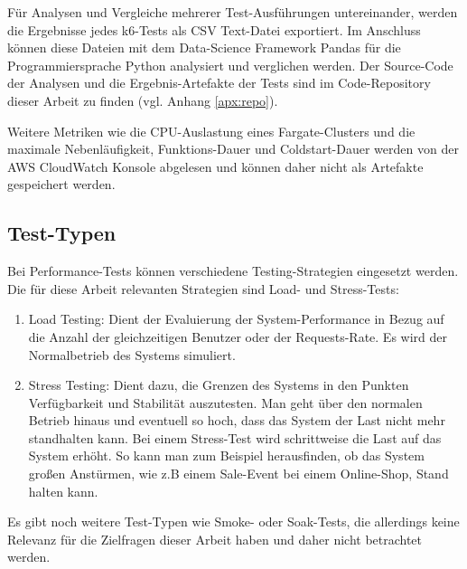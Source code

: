 Für Analysen und Vergleiche mehrerer Test-Ausführungen untereinander, werden die Ergebnisse jedes k6-Tests als \ac{CSV} Text-Datei exportiert. Im Anschluss können diese Dateien mit dem Data-Science Framework Pandas\cite{noauthor_pandas_nodate} für die Programmiersprache Python analysiert und verglichen werden. Der Source-Code der Analysen und die \linebreak Ergebnis-Artefakte der Tests sind im Code-Repository dieser Arbeit zu finden (vgl. Anhang \ref{apx:repo}).

Weitere Metriken wie die CPU-Auslastung eines Fargate-Clusters und die maximale Nebenläufigkeit, Funktions-Dauer und Coldstart-Dauer werden von der \ac{AWS} CloudWatch Konsole abgelesen und können daher nicht als Artefakte gespeichert werden.

\subsection{Test-Typen}
Bei Performance-Tests können verschiedene Testing-Strategien eingesetzt \linebreak werden. Die für diese Arbeit relevanten Strategien sind Load- und Stress-Tests:
\begin{enumerate}
    \item Load Testing: Dient der Evaluierung der System-Performance in Bezug auf die Anzahl der gleichzeitigen Benutzer oder der Requests-Rate. Es wird der Normalbetrieb des Systems simuliert\cite{noauthor_what_nodate-2}.
    
    \item Stress Testing: Dient dazu, die Grenzen des Systems in den Punkten Verfügbarkeit und  Stabilität auszutesten. Man geht über den normalen Betrieb hinaus und eventuell so hoch, dass das System der Last nicht mehr standhalten kann. Bei einem Stress-Test wird schrittweise die Last auf das System erhöht. So kann man zum Beispiel herausfinden, ob das System großen Anstürmen, wie z.B einem Sale-Event bei einem Online-Shop, Stand halten kann\cite{noauthor_what_nodate-1}.
\end{enumerate}

Es gibt noch weitere Test-Typen wie Smoke- oder Soak-Tests, die allerdings keine Relevanz für die Zielfragen dieser Arbeit haben und daher nicht betrachtet werden.

